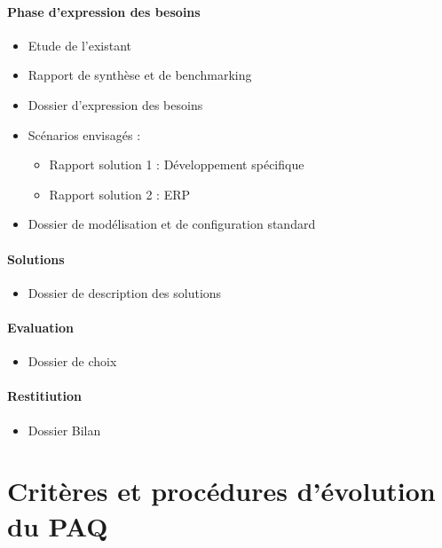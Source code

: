 \paragraph*{Phase d'expression des besoins}
\begin{itemize}

\item Etude de l'existant
\item Rapport de synthèse et de benchmarking
\item Dossier d'expression des besoins
\item Scénarios envisagés :

\begin{itemize}
\item Rapport solution 1 : Développement spécifique
\item Rapport solution 2 : ERP 
\end{itemize}

\item Dossier de modélisation et de configuration standard

\end{itemize}

\paragraph*{Solutions}
\begin{itemize}
\item Dossier de description des solutions
\end{itemize}

\paragraph*{Evaluation}
\begin{itemize}
\item Dossier de choix 
\end{itemize}

\paragraph*{Restitiution} 
\begin{itemize}
\item Dossier Bilan
\end{itemize}

\section{Critères et procédures d'évolution du PAQ}

